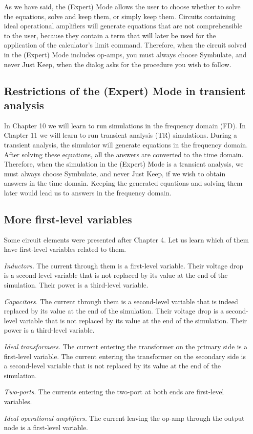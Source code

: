 As we have said, the (Expert) Mode allows the user to choose whether
to solve the equations, solve and keep them, or simply keep them.
Circuits containing ideal operational amplifiers will generate
equations that are not comprehensible to the user, because they
contain a term that will later be used for the application of the
calculator's limit command. Therefore, when the circuit solved in
the (Expert) Mode includes op-amps, you must always choose
Symbulate, and never Just Keep, when the dialog asks for the
procedure you wish to follow.

\subsection{Restrictions of the (Expert) Mode in transient
analysis}

In Chapter 10 we will learn to run simulations in the frequency
domain (FD). In Chapter 11 we will learn to run transient analysis
(TR) simulations. During a transient analysis, the simulator will
generate equations in the frequency domain. After solving these
equations, all the answers are converted to the time domain.
Therefore, when the simulation in the (Expert) Mode is a transient
analysis, we must always choose Symbulate, and never Just Keep, if
we wish to obtain answers in the time domain. Keeping the generated
equations and solving them later would lead us to answers in the
frequency domain.

\subsection{More first-level variables}

Some circuit elements were presented after Chapter 4. Let us learn
which of them have first-level variables related to them.

\emph{Inductors.} The current through them is a first-level
variable. Their voltage drop is a second-level variable that is not
replaced by its value at the end of the simulation. Their power is a
third-level variable.

\emph{Capacitors.} The current through them is a second-level
variable that is indeed replaced by its value at the end of the
simulation. Their voltage drop is a second-level variable that is
not replaced by its value at the end of the simulation. Their power
is a third-level variable.

\emph{Ideal transformers.} The current entering the transformer on
the primary side is a first-level variable. The current entering the
transformer on the secondary side is a second-level variable that is
not replaced by its value at the end of the simulation.

\emph{Two-ports.} The currents entering the two-port at both ends
are first-level variables.

\emph{Ideal operational amplifiers.} The current leaving the op-amp
through the output node is a first-level variable.
